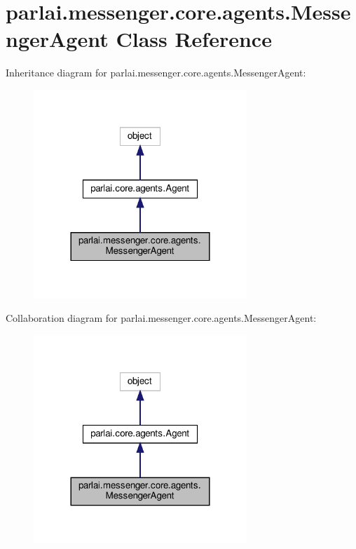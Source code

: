 \hypertarget{classparlai_1_1messenger_1_1core_1_1agents_1_1MessengerAgent}{}\section{parlai.\+messenger.\+core.\+agents.\+Messenger\+Agent Class Reference}
\label{classparlai_1_1messenger_1_1core_1_1agents_1_1MessengerAgent}


Inheritance diagram for parlai.\+messenger.\+core.\+agents.\+Messenger\+Agent\+:
\nopagebreak
\begin{figure}[H]
\begin{center}
\leavevmode
\includegraphics[width=228pt]{classparlai_1_1messenger_1_1core_1_1agents_1_1MessengerAgent__inherit__graph}
\end{center}
\end{figure}


Collaboration diagram for parlai.\+messenger.\+core.\+agents.\+Messenger\+Agent\+:
\nopagebreak
\begin{figure}[H]
\begin{center}
\leavevmode
\includegraphics[width=228pt]{classparlai_1_1messenger_1_1core_1_1agents_1_1MessengerAgent__coll__graph}
\end{center}
\end{figure}

